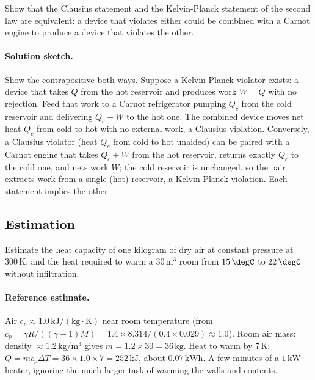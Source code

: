 \begin{exercise}
Show that the Clausius statement and the Kelvin-Planck statement of
the second law are equivalent: a device that violates either could be
combined with a Carnot engine to produce a device that violates the
other.
\paragraph{Solution sketch.} Show the contrapositive both ways.
Suppose a Kelvin-Planck violator exists: a device that takes $Q$ from
the hot reservoir and produces work $W = Q$ with no rejection. Feed
that work to a Carnot refrigerator pumping $Q_c$ from the cold
reservoir and delivering $Q_c + W$ to the hot one. The combined device
moves net heat $Q_c$ from cold to hot with no external work, a Clausius
violation. Conversely, a Clausius violator (heat $Q_c$ from cold to hot
unaided) can be paired with a Carnot engine that takes $Q_c + W$ from
the hot reservoir, returns exactly $Q_c$ to the cold one, and nets work
$W$; the cold reservoir is unchanged, so the pair extracts work from a
single (hot) reservoir, a Kelvin-Planck violation. Each statement
implies the other.
\end{exercise}

\subsection*{Estimation}

\begin{exercise}
Estimate the heat capacity of one kilogram of dry air at constant
pressure at $300\,\si{\kelvin}$, and the heat required to warm a
$30\,\text{m}^3$ room from $15\,\degC$ to $22\,\degC$ without
infiltration.
\paragraph{Reference estimate.} Air $c_p \approx
1.0\,\text{kJ}/(\text{kg}\cdot\si{\kelvin})$ near room temperature
(from $c_p = \gamma R/((\gamma-1)M) = 1.4 \times 8.314/(0.4 \times
0.029) \approx 1.0$). Room air mass: density $\approx
1.2\,\text{kg}/\text{m}^3$ gives $m = 1.2 \times 30 = 36\,\text{kg}$.
Heat to warm by $7\,\si{\kelvin}$: $Q = m c_p \Delta T = 36 \times 1.0
\times 7 = 252\,\text{kJ}$, about $0.07\,\text{kWh}$. A few minutes of a
$1\,\text{kW}$ heater, ignoring the much larger task of warming the
walls and contents.
\end{exercise}

